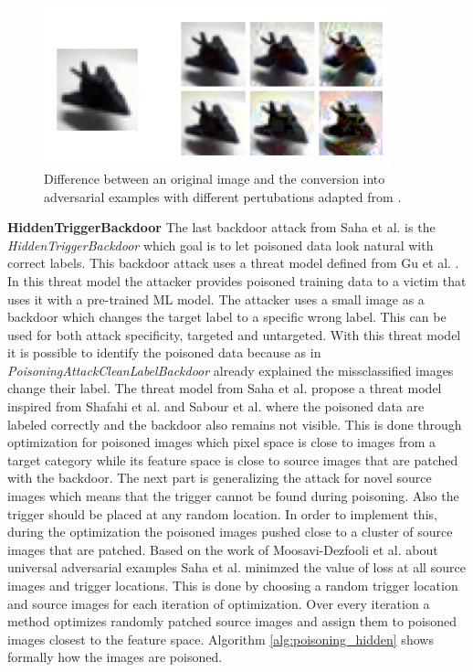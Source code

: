 \begin{figure}[ht!]
  \centering
  \includegraphics[width=10cm]{pictures/poisoned_clean_label.jpg}
  \caption{Difference between an original image and the conversion into adversarial examples with different pertubations adapted from \cite{turner2018clean}.}
  \label{fig:poisoned_clean_label}
\end{figure}

\textbf{HiddenTriggerBackdoor} The last backdoor attack from Saha et al. \cite{DBLP:journals/corr/abs-1910-00033} is the \textit{HiddenTriggerBackdoor} which goal is to let poisoned data look natural with correct labels. This backdoor attack uses a threat model defined from Gu et al. \cite{DBLP:journals/corr/abs-1708-06733}. In this threat model the attacker provides poisoned training data to a victim that uses it with a pre-trained ML model. The attacker uses a small image as a backdoor which changes the target label to a specific wrong label. This can be used for both attack specificity, targeted and untargeted. With this threat model it is possible to identify the poisoned data because as in \textit{PoisoningAttackCleanLabelBackdoor} already explained the missclassified images change their label. The threat model from Saha et al. propose a threat model inspired from Shafahi et al. \cite{DBLP:journals/corr/abs-1804-00792} and Sabour et al. \cite{DBLP:journals/corr/SabourCFF15} where the poisoned data are labeled correctly and the backdoor also remains not visible. This is done through optimization for poisoned images which pixel space is close to images from a target category while its feature space is close to source images that are patched with the backdoor. The next part is generalizing the attack for novel source images which means that the trigger cannot be found during poisoning. Also the trigger should be placed at any random location. In order to implement this, during the optimization the poisoned images pushed close to a cluster of source images that are patched. Based on the work of Moosavi-Dezfooli et al. \cite{DBLP:conf/cvpr/Moosavi-Dezfooli17} about universal adversarial examples Saha et al. minimzed the value of loss at all source images and trigger locations. This is done by choosing a random trigger location and source images for each iteration of optimization. Over every iteration a method optimizes randomly patched source images and assign them to poisoned images closest to the feature space. Algorithm \ref{alg:poisoning_hidden} shows formally how the images are poisoned.

